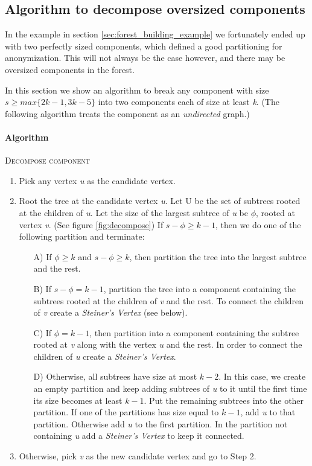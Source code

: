\subsection{Algorithm to decompose oversized components}

In the example in section \ref{sec:forest_building_example} we fortunately ended up with two perfectly sized components, which defined a good partitioning for anonymization. This will not always be the case however, and there may be oversized components in the forest.

In this section we show an algorithm to break any component with size \(s \ge max\{2k-1, 3k-5\}\) into two components each of size at least \textit{k}. (The following algorithm treats the component as an \emph{undirected} graph.)

\paragraph{Algorithm} \textsc{Decompose component} \cite{aggarwal}

\begin{enumerate}
	\item Pick any vertex \textit{u} as the candidate vertex.
	\item Root the tree at the candidate vertex \textit{u}. Let U be the set of subtrees rooted at the children of \textit{u}. Let the size of the largest subtree of \textit{u} be \(\phi\), rooted at vertex \textit{v}. (See figure \ref{fig:decompose}) If \(s-\phi \ge k-1\), then we do one of the following partition and terminate:
	\begin{enumerate}
		\item[A)] If \(\phi \ge k\) and \(s-\phi \ge k\), then partition the tree into the largest subtree and the rest.
		\item[B)] If \(s-\phi = k-1\), partition the tree into a component containing the subtrees rooted at the children of \textit{v} and the rest. To connect the children of \textit{v} create a \emph{Steiner's Vertex} (see below).
		\item[C)] If \(\phi = k-1\), then partition into a component containing the subtree rooted at \textit{v} along with the vertex \textit{u} and the rest. In order to connect the children of \textit{u} create a \emph{Steiner's Vertex}.
		\item[D)] Otherwise, all subtrees have size at most \(k-2\). In this case, we create an empty partition and keep adding subtrees of \textit{u} to it until the first time its size becomes at least \(k-1\). Put the remaining subtrees into the other partition. If one of the partitions has size equal to \(k-1\), add \textit{u} to that partition. Otherwise add \textit{u} to the first partition. In the partition not containing \textit{u} add a \emph{Steiner's Vertex} to keep it connected.
	\end{enumerate}
	\item Otherwise, pick \textit{v} as the new candidate vertex and go to Step 2.
\end{enumerate}

